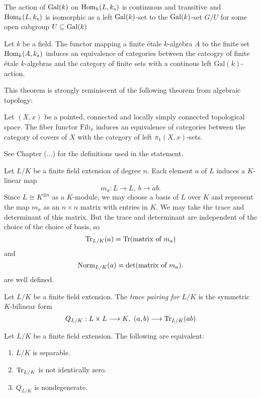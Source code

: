 \begin{proposition}
  The action of $\operatorname{Gal}(k)$ on $\operatorname{Hom}_k(L, k_s)$ is continuous and transitive and $\operatorname{Hom}_k(L, k_s)$ is isomorphic as a left $\operatorname{Gal}(k)$-set to the $\operatorname{Gal}(k)$-set $G/U$ for some open subgroup $U \subseteq \operatorname{Gal}(k)$
\end{proposition}

\begin{theorem}
  Let $k$ be a field. The functor mapping a finite \'etale $k$-algebra $A$ to the finite set $\operatorname{Hom}_k(A, k_s)$ induces an equivalence of categories between the cateogry of finite \'etale $k$-algebras and the category of finite sets with a continous left $\text{Gal}(k)$-action.
\end{theorem}

This theorem is strongly reminiscent of the following theorem from algebraic topology:

\begin{theorem}
  Let $(X,x)$ be a pointed, connected and locally simply connected topological space. The fiber functor $\text{Fib}_x$ induces an equivalence of categories between the category of covers of $X$ with the category of left $\pi_1(X,x)$-sets.
\end{theorem}

See Chapter (...) for the definitions used in the statement.

Let $L/K$ be a finite field extension of degree $n$. Each element $a$ of $L$ induces a $K$-linear map 
\[
  m_a: L \to L,\ b \to ab.
\]
Since $L \cong K^{\oplus n}$ as a $K$-module, we may choose a basis of $L$ over $K$ and represent the map $m_a$ as an $n \times n$ matrix with entries in $K$. We may take the trace and determinant of this matrix. But the trace and determinant are independent of the choice of the choice of basis, so
\[ 
  \operatorname{Tr}_{L/K}(a) = \operatorname{Tr}(\text{matrix of }m_a)
\]
and
\[ 
  \operatorname{Norm}_{L/K}(a) = \text{det}(\text{matrix of }m_a).
\]
are well defined.

\begin{definition}
  Let $L/K$ be a finite field extension. The \textit{trace pairing for $L/K$} is the symmetric $K$-bilinear form
  \[
    Q_{L/K} : L \times L \longrightarrow K,\ (a,b) \longrightarrow \operatorname{Tr}_{L/K}(ab)
  \]
\end{definition}

\begin{lemma}
  Let $L/K$ be a finite field extension. The following are equivalent:
  \begin{enumerate}
    \item $L/K$ is separable.
    \item $\operatorname{Tr}_{L/K}$ is not identically zero.
    \item $Q_{L/K}$ is nondegenerate.
  \end{enumerate}
\end{lemma}

